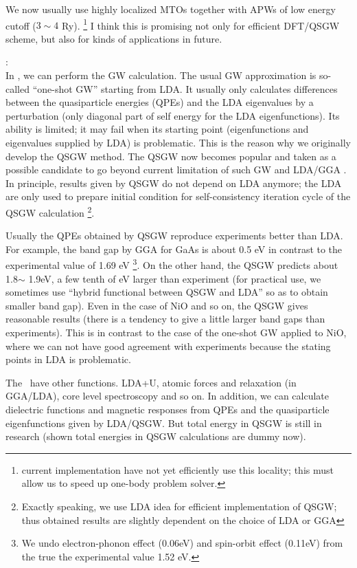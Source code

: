 We now usually use highly localized MTOs
together with APWs of low energy cutoff ($3\sim 4$ Ry).
\footnote{current
implementation have not yet efficiently use this locality; this must allow
us to speed up one-body problem solver.} 
I think this is promising not only for efficient DFT/QSGW scheme, 
but also for kinds of applications in future. 

:\\
In \ecalj, we can perform the GW calculation.
The usual GW approximation is so-called ``one-shot GW'' starting from LDA. 
It usually only calculates differences between the quasiparticle energies (QPEs) 
and the LDA eigenvalues by a perturbation (only diagonal part of self
energy for the LDA eigenfunctions).
Its ability is limited; it may fail when its starting point 
(eigenfunctions and eigenvalues supplied by LDA) is problematic.
This is the reason why we originally develop the QSGW method. 
The QSGW now becomes popular and taken as a possible candidate to go
beyond current limitation of such GW and LDA/GGA \cite{di_valentin_quasiparticle_2014}.
In principle, results given by QSGW do not depend on LDA anymore; 
the LDA are only used to prepare initial condition for
self-consistency iteration cycle of the QSGW calculation 
\footnote{Exactly speaking, we use LDA idea 
for efficient implementation of QSGW; thus
obtained results are slightly dependent on the choice of LDA or GGA}.

Usually the QPEs obtained by QSGW reproduce experiments better than LDA.
For example, the band gap by GGA for GaAs is about 0.5 eV in contrast
to the experimental value of 1.69 eV
\footnote{We undo electron-phonon effect
(0.06eV) and spin-orbit effect (0.11eV) from the true the experimental value 1.52 eV.}. 
On the other hand, the QSGW predicts about 1.8$\sim$ 1.9eV, a few tenth of eV
larger than experiment (for practical use, we sometimes 
use ``hybrid functional between QSGW and LDA'' 
so as to obtain smaller band gap).
Even in the case of NiO and so on, the QSGW gives reasonable
results (there is a tendency to give a little larger band gaps than experiments).
This is in contrast to the case of the one-shot GW applied to NiO, 
where we can not have good agreement with experiments
because the stating points in LDA is problematic.

The \ecalj\ have other functions.
LDA+U, atomic forces and relaxation (in GGA/LDA), core level
spectroscopy and so on.  In addition, we can calculate
dielectric functions and magnetic responses 
from QPEs and the quasiparticle eigenfunctions 
given by LDA/QSGW.  
But total energy in QSGW is still in research 
(shown total energies in QSGW calculations are dummy now).

